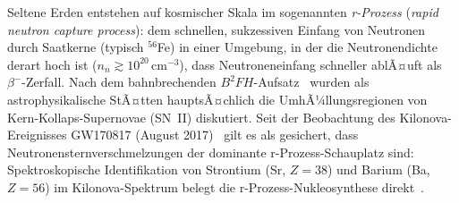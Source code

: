 ﻿\documentclass[12pt, a4paper]{report}
\theoremstyle{definition}
\theoremstyle{remark}
\begin{document}
Seltene Erden entstehen auf kosmischer Skala im sogenannten
\emph{r-Prozess} (\emph{rapid neutron capture process}): dem schnellen,
sukzessiven Einfang von Neutronen durch Saatkerne (typisch $^{56}$Fe) in
einer Umgebung, in der die Neutronendichte derart hoch ist
($n_n \gtrsim 10^{20}\,\text{cm}^{-3}$), dass Neutroneneinfang schneller
ablÃ¤uft als $\beta^-$-Zerfall. Nach dem bahnbrechenden
$B^2FH$-Aufsatz~\cite{burbidge1957} wurden als astrophysikalische
StÃ¤tten hauptsÃ¤chlich die UmhÃ¼llungsregionen von Kern-Kollaps-Supernovae
(SN~II) diskutiert. Seit der Beobachtung des Kilonova-Ereignisses GW170817
(August 2017)~\cite{abbott2016} gilt es als gesichert, dass
Neutronensternverschmelzungen der dominante r-Prozess-Schauplatz sind:
Spektroskopische Identifikation von Strontium (Sr, $Z = 38$) und Barium
(Ba, $Z = 56$) im Kilonova-Spektrum belegt die r-Prozess-Nukleosynthese
direkt~\cite{smartt2017}.
\end{document}
